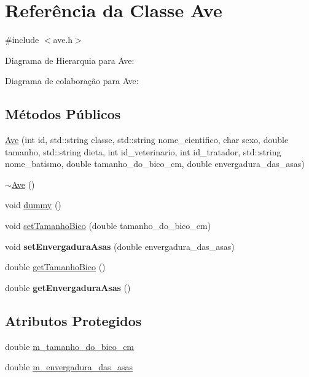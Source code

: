 \hypertarget{classAve}{}\section{Referência da Classe Ave}
\label{classAve}


{\ttfamily \#include $<$ave.\+h$>$}



Diagrama de Hierarquia para Ave\+:


Diagrama de colaboração para Ave\+:
\subsection*{Métodos Públicos}
\begin{DoxyCompactItemize}
\item 
\hyperlink{classAve_a7a85f41ae3a0a5722c66b4213c38fd86}{Ave} (int id, std\+::string classe, std\+::string nome\+\_\+cientifico, char sexo, double tamanho, std\+::string dieta, int id\+\_\+veterinario, int id\+\_\+tratador, std\+::string nome\+\_\+batismo, double tamanho\+\_\+do\+\_\+bico\+\_\+cm, double envergadura\+\_\+das\+\_\+asas)
\item 
\hyperlink{classAve_ad290be8d6fb95f1cfd24b5f55def7741}{$\sim$\+Ave} ()
\item 
void \hyperlink{classAve_a9cf98dd6d66c29bc4d8e4f23992ead9c}{dummy} ()
\item 
void \hyperlink{classAve_a902617014d3400ee315b16599ee0f8ee}{set\+Tamanho\+Bico} (double tamanho\+\_\+do\+\_\+bico\+\_\+cm)
\item 
\mbox{\label{classAve_a22a10ae91ac813655aa663dd11b61d27}} 
void {\bfseries set\+Envergadura\+Asas} (double envergadura\+\_\+das\+\_\+asas)
\item 
double \hyperlink{classAve_a2ff747110c5118515b842351e708a0d0}{get\+Tamanho\+Bico} ()
\item 
\mbox{\label{classAve_a2c4997b9909169eea956b4e879578412}} 
double {\bfseries get\+Envergadura\+Asas} ()
\end{DoxyCompactItemize}
\subsection*{Atributos Protegidos}
\begin{DoxyCompactItemize}
\item 
double \hyperlink{classAve_a6b226ae4077430877b040141105a9890}{m\+\_\+tamanho\+\_\+do\+\_\+bico\+\_\+cm}
\item 
double \hyperlink{classAve_a6261373aae903e524e220e53ded18693}{m\+\_\+envergadura\+\_\+das\+\_\+asas}
\end{DoxyCompactItemize}
